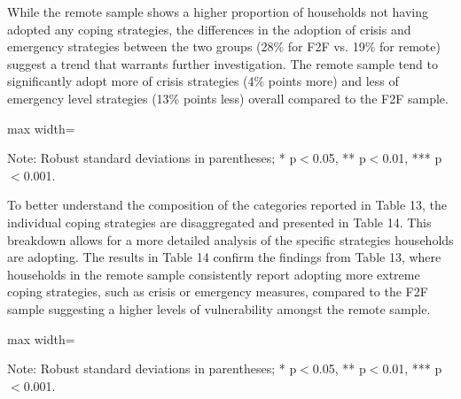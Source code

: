 \documentclass[11pt,harvard]{article}
\begin{document}
   While the remote sample shows a higher proportion of households not having adopted any coping strategies, the differences in the adoption of crisis and emergency strategies between the two groups (28\% for F2F vs. 19\% for remote) suggest a trend that warrants further investigation. The remote sample tend to significantly adopt more of crisis strategies (4\% points more) and less of emergency level strategies (13\% points less) overall compared to the F2F sample.
	
	\begin{table}[htbp]
		\centering
		\begin{adjustbox}{max width=\textwidth}
			\begin{threeparttable}
				\caption{Impact of Survey Modality on Livelihood Coping Strategy}
				\scriptsize%
				 
				\label{tab:LCS_Modality_BF}
				\begin{tablenotes}
					\item Note: Robust standard deviations in parentheses; * p$<$0.05, ** p$<$0.01, *** p$<$0.001. 
				\end{tablenotes}
			\end{threeparttable}
		\end{adjustbox}
	\end{table}
	
	To better understand the composition of the categories reported in Table 13, the individual coping strategies are disaggregated and presented in Table 14. This breakdown allows for a more detailed analysis of the specific strategies households are adopting. The results in Table 14 confirm the findings from Table 13, where households in the remote sample consistently report adopting more extreme coping strategies, such as crisis or emergency measures, compared to the F2F sample suggesting a higher levels of vulnerability amongst the remote sample.
	
	\begin{table}[htbp]
		\centering
		\begin{adjustbox}{max width=\textwidth}
			\begin{threeparttable}
				\caption{Distribution of Individual Coping Strategies Adopted}
				\scriptsize%
				 
				\label{tab:LCS_Ind_Modality_BF}
				\begin{tablenotes}
					\item Note: Robust standard deviations in parentheses; * p$<$0.05, ** p$<$0.01, *** p$<$0.001.
				\end{tablenotes}
			\end{threeparttable}
		\end{adjustbox}
	\end{table}
	
\end{document}
